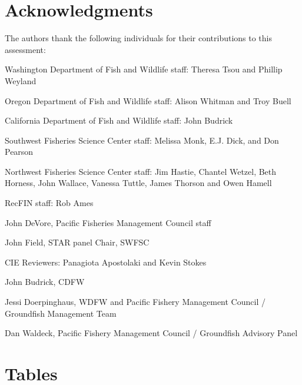 \documentclass[12pt,]{article}
\begin{document}
\newpage

\section{Acknowledgments}\label{acknowledgments}

The authors thank the following individuals for their contributions to
this assessment:

Washington Department of Fish and Wildlife staff: Theresa Tsou and
Phillip Weyland

Oregon Department of Fish and Wildlife staff: Alison Whitman and Troy
Buell

California Department of Fish and Wildlife staff: John Budrick

Southwest Fisheries Science Center staff: Melissa Monk, E.J. Dick, and
Don Pearson

Northwest Fisheries Science Center staff: Jim Hastie, Chantel Wetzel,
Beth Horness, John Wallace, Vanessa Tuttle, James Thorson and Owen
Hamell

RecFIN staff: Rob Ames

John DeVore, Pacific Fisheries Management Council staff

John Field, STAR panel Chair, SWFSC

CIE Reviewers: Panagiota Apostolaki and Kevin Stokes

John Budrick, CDFW

Jessi Doerpinghaus, WDFW and Pacific Fishery Management Council /
Groundfish Management Team

Dan Waldeck, Pacific Fishery Management Council / Groundfish Advisory
Panel

\newpage

\renewcommand{\thefigure}{\arabic{figure}}
\renewcommand{\thetable}{\arabic{table}}

\setcounter{figure}{0} \setcounter{table}{0} \newpage

\captionsetup[table]{labelformat=simple,format=plain,labelsep=period}

\section{Tables}\label{tables}
\end{document}
